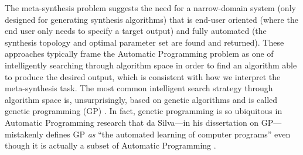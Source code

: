 \documentclass[12pt]{report} 	%
\numberwithin{figure}{chapter}
\numberwithin{table}{chapter}
\numberwithin{equation}{chapter}
\begin{document}
\begin{flushleft}
The meta-synthesis problem suggests the need for a narrow-domain system (only designed for generating synthesis algorithms) that is end-user oriented (where the end user only needs to specify a target output) and fully automated (the synthesis topology and optimal parameter set are found and returned). These approaches typically frame the Automatic Programming problem as one of intelligently searching through algorithm space in order to find an algorithm able to produce the desired output, which is consistent with how we interpret the meta-synthesis task. The most common intelligent search strategy through algorithm space is, unsurprisingly, based on genetic algorithms and is called genetic programming (GP) \cite{Koza:1992gp}. In fact, genetic programming is so ubiquitous in Automatic Programming research that da Silva---in his dissertation on GP---mistakenly defines GP \textit{as} ``the automated learning of computer programs'' even though it is actually a subset of Automatic Programming \cite[p. ix]{Silva:2008le}.


\end{flushleft}
\end{document}
